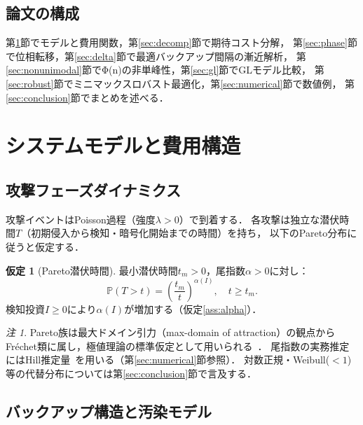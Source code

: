 \documentclass[12pt,a4paper]{article}
\theoremstyle{plain}
\theoremstyle{definition}
\newtheorem{assumption}[theorem]{仮定}
\theoremstyle{remark}
\newtheorem{remark}[theorem]{注}
\newcommand{\Prob}{\mathbb{P}}
\begin{document}
\subsection{論文の構成}

第\ref{sec:model}節でモデルと費用関数，第\ref{sec:decomp}節で期待コスト分解，
第\ref{sec:phase}節で位相転移，第\ref{sec:delta}節で最適バックアップ間隔の漸近解析，
第\ref{sec:nonunimodal}節でΦ(n)の非単峰性，第\ref{sec:gl}節でGLモデル比較，
第\ref{sec:robust}節でミニマックスロバスト最適化，第\ref{sec:numerical}節で数値例，
第\ref{sec:conclusion}節でまとめを述べる．

\section{システムモデルと費用構造}
\label{sec:model}

\subsection{攻撃フェーズダイナミクス}

攻撃イベントはPoisson過程（強度$\lambda>0$）で到着する．
各攻撃は独立な潜伏時間$T$（初期侵入から検知・暗号化開始までの時間）を持ち，
以下のPareto分布に従うと仮定する．

\begin{assumption}[Pareto潜伏時間]\label{ass:pareto}
最小潜伏時間$t_m>0$，尾指数$\alpha>0$に対し：
\begin{equation}\label{eq:pareto}
  \Prob(T>t)=\left(\frac{t_m}{t}\right)^{\alpha(I)},\quad t\ge t_m.
\end{equation}
検知投資$I\ge0$により$\alpha(I)$が増加する（仮定\ref{ass:alpha}）．
\end{assumption}

\begin{remark}
Pareto族は最大ドメイン引力（max-domain of attraction）の観点から
Fréchet類に属し，極値理論の標準仮定として用いられる~\cite{embrechts1997}．
尾指数の実務推定にはHill推定量~\cite{hill1975}を用いる（第\ref{sec:numerical}節参照）．
対数正規・Weibull($<1$)等の代替分布については第\ref{sec:conclusion}節で言及する．
\end{remark}

\subsection{バックアップ構造と汚染モデル}
\end{document}
